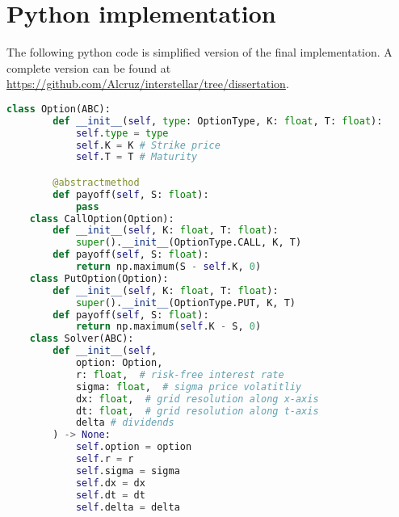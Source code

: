 \section{Python implementation}
The following python code is simplified version of the final implementation. A complete version can be found at \url{https://github.com/Alcruz/interstellar/tree/dissertation}.

\begin{lstlisting}[language=Python, caption=Base classses for options solver.]
    class Option(ABC):
        def __init__(self, type: OptionType, K: float, T: float):
            self.type = type
            self.K = K # Strike price
            self.T = T # Maturity

        @abstractmethod
        def payoff(self, S: float):
            pass
    class CallOption(Option):
        def __init__(self, K: float, T: float):
            super().__init__(OptionType.CALL, K, T)
        def payoff(self, S: float):
            return np.maximum(S - self.K, 0) 
    class PutOption(Option):
        def __init__(self, K: float, T: float):
            super().__init__(OptionType.PUT, K, T)
        def payoff(self, S: float):
            return np.maximum(self.K - S, 0)
    class Solver(ABC): 
        def __init__(self, 
            option: Option,
            r: float,  # risk-free interest rate
            sigma: float,  # sigma price volatitliy
            dx: float,  # grid resolution along x-axis
            dt: float,  # grid resolution along t-axis
            delta # dividends
        ) -> None:
            self.option = option
            self.r = r
            self.sigma = sigma
            self.dx = dx
            self.dt = dt
            self.delta = delta
\end{lstlisting}

